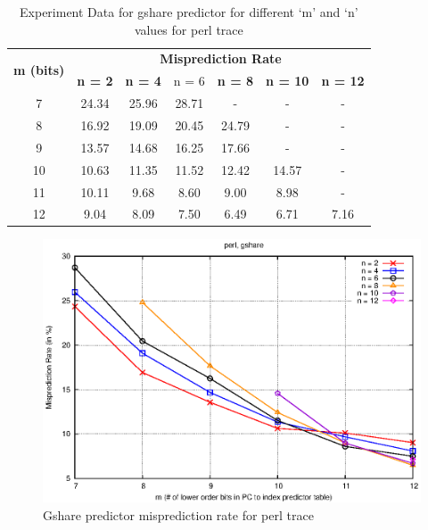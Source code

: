 \begin{table}[htbp]
    \centering
    \begin{tabular}{|c|c|c|c|c|c|c|}
        \hline
        \multirow{2}[6]{*}{\bf m (bits) } & \multicolumn{6}{c|}{\bf Misprediction Rate} \\
        \cline{2-7} & \bf n = 2 & \bf n = 4 & n = 6 & \bf n = 8 & \bf n = 10 & \bf n = 12 \\
        \hline
         7 & 24.34 & 25.96 & 28.71 &     - &     - &    - \\
         8 & 16.92 & 19.09 & 20.45 & 24.79 &     - &    - \\
         9 & 13.57 & 14.68 & 16.25 & 17.66 &     - &    - \\
        10 & 10.63 & 11.35 & 11.52 & 12.42 & 14.57 &    - \\
        11 & 10.11 &  9.68 &  8.60 &  9.00 &  8.98 &    - \\
        12 &  9.04 &  8.09 &  7.50 &  6.49 &  6.71 & 7.16 \\
        \hline
    \end{tabular}
    \captionsetup{justification=centering}
    \caption{Experiment Data for gshare predictor for different `m' and `n' values for perl trace}
    \label{tab:gshare_perl}
\end{table}

\begin{figure} [htbp]
    \centering
    \includegraphics [scale=1.32] {image/perl_gshare.eps}
    \caption{Gshare predictor misprediction rate for perl trace}
    \label{fig:gshare_perl}
\end{figure}

